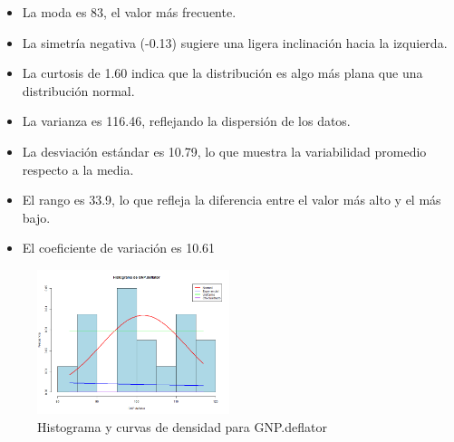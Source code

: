 \documentclass{article}
\begin{document}
\begin{itemize}
\begin{itemize}
\begin{itemize}
                \item La moda es 83, el valor más frecuente.
                \item La simetría negativa (-0.13) sugiere una ligera inclinación hacia la izquierda.
                \item La curtosis de 1.60 indica que la distribución es algo más plana que una distribución normal.
                \item La varianza es 116.46, reflejando la dispersión de los datos.
                \item La desviación estándar es 10.79, lo que muestra la variabilidad promedio respecto a la media.
                \item El rango es 33.9, lo que refleja la diferencia entre el valor más alto y el más bajo.
                \item El coeficiente de variación es 10.61%
            \end{itemize}
    \end{itemize}

    \begin{figure}[H]
        \centering
        \includegraphics[width=0.5\textwidth]{HistogramasDensidad/histograma_GNP.deflator.png}
        \caption{Histograma y curvas de densidad para GNP.deflator}
        \vspace{0.5cm}
    \end{figure}

    

\end{itemize}
\end{document}
